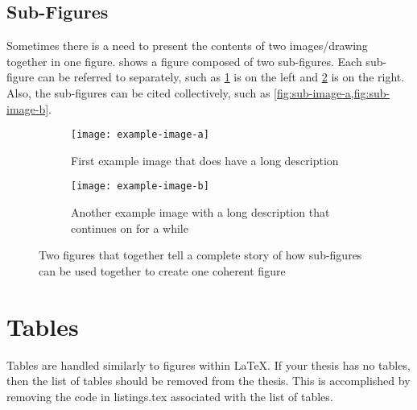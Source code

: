 \subsection{Sub-Figures}
    Sometimes there is a need to present the contents of two images/drawing together in one figure.
     shows a figure composed of two sub-figures.
    Each sub-figure can be referred to separately, such as \cref{fig:sub-image-a} is on the left and \cref{fig:sub-image-b} is on the right.
    Also, the sub-figures can be cited collectively, such as \cref{fig:sub-image-a,fig:sub-image-b}.
    \begin{figure}
        \centering
        \begin{subfigure}[t]{2.5in}
            \texttt{[image: example-image-a]}
            \caption{First example image that does have a long description}
            \label{fig:sub-image-a}
        \end{subfigure}
        \hspace{0.2in}
        \begin{subfigure}[t]{2.5in}
            \texttt{[image: example-image-b]}
            \caption[size=normal]{Another example image with a long description that continues on for a while}
            \label{fig:sub-image-b}
        \end{subfigure}
        \captionsetup{width=5.25in}
        \caption{Two figures that together tell a complete story of how sub-figures can be used together to create one coherent figure}
        \label{fig:subfig-example}
    \end{figure}

\section{Tables} \label{sec:Tables}
    Tables are handled similarly to figures within \LaTeX.
    If your thesis has no tables, then the list of tables should be removed from the thesis.
    This is accomplished by removing the code in listings.tex associated with the list of tables.

